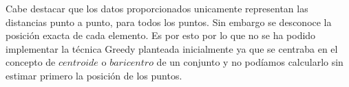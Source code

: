 \documentclass[11pt,a4paper]{article}
\begin{document}
	Cabe destacar que los datos proporcionados unicamente representan las distancias punto a punto, para todos los puntos. Sin embargo se desconoce la posición exacta de cada elemento. Es por esto por lo que no se ha podido implementar la técnica Greedy planteada inicialmente ya que se centraba en el concepto de $centroide$ o $baricentro$ de un conjunto y no podíamos calcularlo sin estimar primero la posición de los puntos.


\iffalse 

	
	Tras este procedimiento, el programa termina con la bomba desactivada. \\
	
	\begin{figure}[H] 
		\centering
		\texttt{[image: capturas/prueba1.png]} 
		\caption{Bomba de prueba - gdb} \label{fig:figura25}
	\end{figure}
	
	\fi
	
\end{document}
